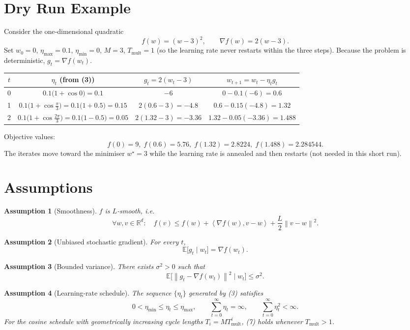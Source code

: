 \documentclass{article}
\newtheorem{assumption}{Assumption}
\newcommand{\E}{\mathbb{E}}
\newcommand{\norm}[1]{\left\lVert#1\right\rVert}
\newcommand{\ip}[2]{\left\langle #1,#2\right\rangle}
\begin{document}
\section*{Dry Run Example}
Consider the one‑dimensional quadratic
\[
f(w)=(w-3)^{2},\qquad \nabla f(w)=2(w-3).
\]
Set $w_{0}=0$, $\eta_{\max}=0.1$, $\eta_{\min}=0$, $M=3$, $T_{\text{mult}}=1$ (so the
learning rate never restarts within the three steps).  
Because the problem is deterministic, $g_{t}=\nabla f(w_{t})$.

\begin{center}
\begin{tabular}{c|c|c|c}
$t$ & $\eta_{t}$ (from (3)) & $g_{t}=2(w_{t}-3)$ & $w_{t+1}=w_{t}-\eta_{t}g_{t}$\\\hline
0 & $0.1\bigl(1+\cos 0\bigr)=0.1$ & $-6$ & $0-0.1(-6)=0.6$\\
1 & $0.1\bigl(1+\cos\frac{\pi}{3}\bigr)=0.1\bigl(1+0.5\bigr)=0.15$ & $2(0.6-3)=-4.8$ & $0.6-0.15(-4.8)=1.32$\\
2 & $0.1\bigl(1+\cos\frac{2\pi}{3}\bigr)=0.1\bigl(1-0.5\bigr)=0.05$ & $2(1.32-3)=-3.36$ & $1.32-0.05(-3.36)=1.488$
\end{tabular}
\end{center}
Objective values:
\[
f(0)=9,\; f(0.6)=5.76,\; f(1.32)=2.8224,\; f(1.488)=2.284544 .
\]
The iterates move toward the minimiser $w^{\star}=3$ while the learning rate
is annealed and then restarts (not needed in this short run).

\newpage
\section*{Assumptions}
\begin{assumption}[Smoothness]\label{as:smooth}
$f$ is $L$‑smooth, i.e.
\[
\forall w,v\in\mathbb{R}^{d}:\quad
f(v)\le f(w)+\ip{\nabla f(w)}{v-w}+\frac{L}{2}\norm{v-w}^{2}.     \tag{4}
\]
\end{assumption}
\begin{assumption}[Unbiased stochastic gradient]\label{as:unbiased}
For every $t$,
\[
\E\bigl[g_{t}\mid w_{t}\bigr]=\nabla f(w_{t}).                         \tag{5}
\]
\end{assumption}
\begin{assumption}[Bounded variance]\label{as:variance}
There exists $\sigma^{2}>0$ such that
\[
\E\bigl[\norm{g_{t}-\nabla f(w_{t})}^{2}\mid w_{t}\bigr]\le\sigma^{2}. \tag{6}
\]
\end{assumption}
\begin{assumption}[Learning‑rate schedule]\label{as:lr}
The sequence $\{\eta_{t}\}$ generated by (3) satisfies
\[
0<\eta_{\min}\le\eta_{t}\le\eta_{\max},\qquad
\sum_{t=0}^{\infty}\eta_{t}= \infty,\qquad
\sum_{t=0}^{\infty}\eta_{t}^{2}<\infty.                              \tag{7}
\]
For the cosine schedule with geometrically increasing cycle lengths
$T_{i}=M T_{\text{mult}}^{i}$, (7) holds whenever $T_{\text{mult}}>1$.
\end{assumption}
\end{document}

